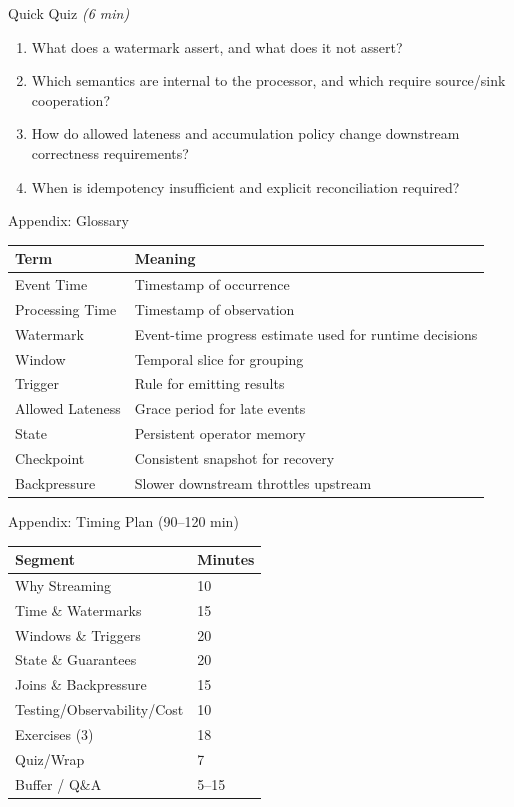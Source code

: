 \documentclass[aspectratio=169,11pt]{beamer}
\newcommand{\mins}[1]{\textit{(#1 min)}}
\begin{document}
\begin{frame}{Quick Quiz \mins{6}}
  \begin{enumerate}
    \item What does a watermark assert, and what does it not assert?
    \item Which semantics are internal to the processor, and which require source/sink cooperation?
    \item How do allowed lateness and accumulation policy change downstream correctness requirements?
    \item When is idempotency insufficient and explicit reconciliation required?
  \end{enumerate}
\end{frame}

\contactslide

\appendix
\begin{frame}{Appendix: Glossary}
\small
\begin{tabular}{@{}ll@{}}
\toprule
Term & Meaning \\
\midrule
Event Time & Timestamp of occurrence \\
Processing Time & Timestamp of observation \\
Watermark & Event-time progress estimate used for runtime decisions \\
Window & Temporal slice for grouping \\
Trigger & Rule for emitting results \\
Allowed Lateness & Grace period for late events \\
State & Persistent operator memory \\
Checkpoint & Consistent snapshot for recovery \\
Backpressure & Slower downstream throttles upstream \\
\bottomrule
\end{tabular}
\end{frame}

\begin{frame}{Appendix: Timing Plan (90–120 min)}
\small
\begin{tabular}{@{}ll@{}}
\toprule
Segment & Minutes \\
\midrule
Why Streaming & 10 \\
Time \& Watermarks & 15 \\
Windows \& Triggers & 20 \\
State \& Guarantees & 20 \\
Joins \& Backpressure & 15 \\
Testing/Observability/Cost & 10 \\
Exercises (3) & 18 \\
Quiz/Wrap & 7 \\
Buffer / Q\&A & 5--15 \\
\bottomrule
\end{tabular}
\end{frame}
\end{document}
